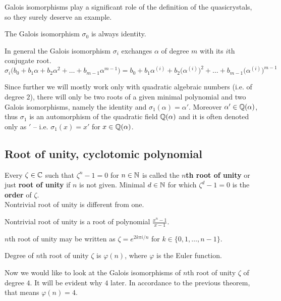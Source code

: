 \documentclass[text.tex]{subfiles}
\begin{document}
Galois isomorphisms play a significant role of the definition of the quasicrystals, so they surely deserve an example. 

The Galois isomorphism $\sigma_0$ is always identity.

In general the Galois isomorphism $\sigma_i$ exchanges $\alpha$ of degree $m$ with its $i$th conjugate root. 
$$\sigma_i\big(b_0 + b_1\alpha + b_2\alpha^2 + \dots + b_{m-1}\alpha^{m-1}\big) = b_0 + b_1\alpha^{(i)} + b_2\big(\alpha^{(i)}\big)^2 + \dots + b_{m-1}\big(\alpha^{(i)}\big)^{m-1}$$

Since further we will mostly work only with quadratic algebraic numbers (i.e. of degree $2$), there will only be two roots of a given minimal polynomial and two Galois isomorphisms, namely the identity and $\sigma_1(\alpha) = \alpha'$. Moreover $\alpha'\in\mathbb{Q}(\alpha)$, thus $\sigma_1$ is an automorphism of the quadratic field $\mathbb{Q}(\alpha)$ and it is often denoted only as $'$ -- i.e. $\sigma_1(x) = x'$ for $x\in\mathbb{Q}(\alpha)$.

\subsection{Root of unity, cyclotomic polynomial}\label{sec_rootOfUnity}

\begin{definition}
Every $\zeta\in\mathbb{C}$ such that $\zeta^n-1=0$ for $n\in\mathbb{N}$ is called the \textbf{$n$th root of unity} or just \textbf{root of unity} if $n$ is not given. Minimal $d\in\mathbb{N}$ for which $\zeta^d-1=0$ is the \textbf{order} of $\zeta$. \\
Nontrivial root of unity is different from one. 
\end{definition}

\begin{remark}
Nontrivial root of unity is a root of polynomial $\frac{x^n-1}{x-1}$.
\end{remark}

\begin{remark}
$n$th root of unity may be written as $\zeta = e^{2k\pi i/n}$ for $k\in \{0, 1, \dots, n-1\}$.
\end{remark}

\begin{theorem}
Degree of $n$th root of unity $\zeta$ is $\varphi(n)$, where $\varphi$ is the Euler function.
\end{theorem}

Now we would like to look at the Galois isomorphisms of $n$th root of unity $\zeta$ of degree $4$. It will be evident why $4$ later. In accordance to the previous theorem, that means $\varphi(n)=4$. 
\end{document}

